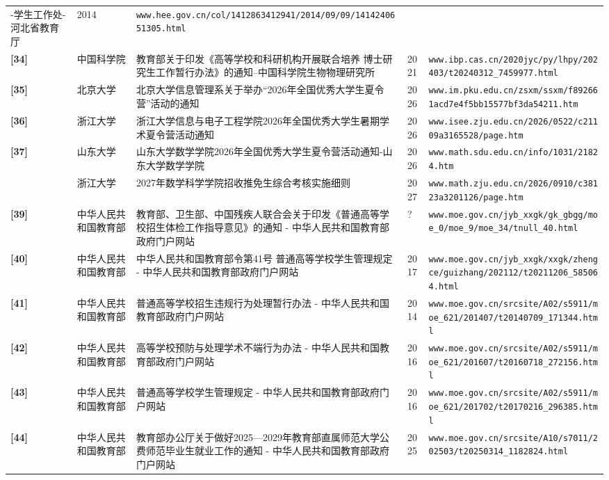 {\begin{longtable}{@{}p{1.15cm}p{2.9cm}p{6.3cm}p{0.85cm}p{5.0cm}@{}}
-学生工作处-河北省教育厅 & 2014 & \texttt{www.hee.gov.cn/col/1412863412941/2014/09/09/1414240651305.html} \\
\textbf{[34]} & 中国科学院 & 教育部关于印发《高等学校和科研机构开展联合培养 博士研究生工作暂行办法》的通知--中国科学院生物物理研究所 & 2021 & \texttt{www.ibp.cas.cn/2020jyc/py/lhpy/202403/t20240312\_7459977.html} \\
\textbf{[35]} & 北京大学 & 北京大学信息管理系关于举办“2026年全国优秀大学生夏令营”活动的通知 & 2026 & \texttt{www.im.pku.edu.cn/zsxm/ssxm/f892661acd7e4f5bb15577bf3da54211.htm} \\
\textbf{[36]} & 浙江大学 & 浙江大学信息与电子工程学院2026年全国优秀大学生暑期学术夏令营活动通知 & 2026 & \texttt{www.isee.zju.edu.cn/2026/0522/c21109a3165528/page.htm} \\
\textbf{[37]} & 山东大学 & 山东大学数学学院2026年全国优秀大学生夏令营活动通知-山东大学数学学院 & 2026 & \texttt{www.math.sdu.edu.cn/info/1031/21824.htm} \\
[38] & 浙江大学 & 2027年数学科学学院招收推免生综合考核实施细则 & 2027 & \texttt{www.math.zju.edu.cn/2026/0910/c38123a3201126/page.htm} \\
\textbf{[39]} & 中华人民共和国教育部 & 教育部、卫生部、中国残疾人联合会关于印发《普通高等学校招生体检工作指导意见》的通知 - 中华人民共和国教育部政府门户网站 & ? & \texttt{www.moe.gov.cn/jyb\_xxgk/gk\_gbgg/moe\_0/moe\_9/moe\_34/tnull\_40.html} \\
\textbf{[40]} & 中华人民共和国教育部 & 中华人民共和国教育部令第41号 普通高等学校学生管理规定 - 中华人民共和国教育部政府门户网站 & 2017 & \texttt{www.moe.gov.cn/jyb\_xxgk/xxgk/zhengce/guizhang/202112/t20211206\_585064.html} \\
\textbf{[41]} & 中华人民共和国教育部 & 普通高等学校招生违规行为处理暂行办法 - 中华人民共和国教育部政府门户网站 & 2014 & \texttt{www.moe.gov.cn/srcsite/A02/s5911/moe\_621/201407/t20140709\_171344.html} \\
\textbf{[42]} & 中华人民共和国教育部 & 高等学校预防与处理学术不端行为办法 - 中华人民共和国教育部政府门户网站 & 2016 & \texttt{www.moe.gov.cn/srcsite/A02/s5911/moe\_621/201607/t20160718\_272156.html} \\
\textbf{[43]} & 中华人民共和国教育部 & 普通高等学校学生管理规定 - 中华人民共和国教育部政府门户网站 & 2016 & \texttt{www.moe.gov.cn/srcsite/A02/s5911/moe\_621/201702/t20170216\_296385.html} \\
\textbf{[44]} & 中华人民共和国教育部 & 教育部办公厅关于做好2025—2029年教育部直属师范大学公费师范毕业生就业工作的通知 - 中华人民共和国教育部政府门户网站 & 2025 & \texttt{www.moe.gov.cn/srcsite/A10/s7011/202503/t20250314\_1182824.html} \\

\end{longtable}}
